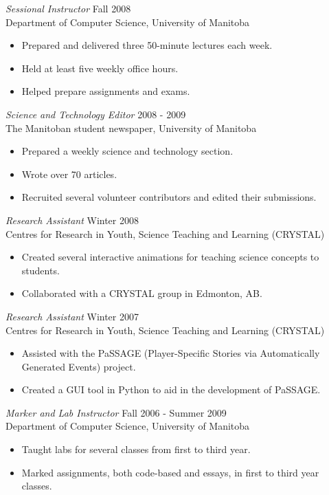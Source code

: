 \documentclass[line,margin]{res}
\begin{document}
\begin{resume}
  {\sl Sessional Instructor} \hfill Fall 2008 \\
  Department of Computer Science, University of Manitoba
  \begin{itemize}  \itemsep -2pt %
    \item Prepared and delivered three 50-minute lectures each week.
    \item Held at least five weekly office hours.
    \item Helped prepare assignments and exams.
  \end{itemize}

  {\sl Science and Technology Editor} \hfill 2008 - 2009 \\
  The Manitoban student newspaper, University of Manitoba
  \begin{itemize}  \itemsep -2pt %
    \item Prepared a weekly science and technology section.
    \item Wrote over 70 articles.
    \item Recruited several volunteer contributors and edited their submissions.
  \end{itemize}
  
  {\sl Research Assistant} \hfill Winter 2008 \\
  Centres for Research in Youth, Science Teaching and Learning (CRYSTAL)
  \begin{itemize}  \itemsep -2pt %
    \item Created several interactive animations for teaching science concepts to students.
    \item Collaborated with a CRYSTAL group in Edmonton, AB.
  \end{itemize}
  
  {\sl Research Assistant} \hfill Winter 2007 \\
  Centres for Research in Youth, Science Teaching and Learning (CRYSTAL)
  \begin{itemize}  \itemsep -2pt %
    \item Assisted with the PaSSAGE (Player-Specific Stories via Automatically Generated Events) project.
    \item Created a GUI tool in Python to aid in the development of PaSSAGE.
  \end{itemize}
  
  {\sl Marker and Lab Instructor} \hfill Fall 2006 - Summer 2009 \\
  Department of Computer Science, University of Manitoba
  \begin{itemize}  \itemsep -2pt %
    \item Taught labs for several classes from first to third year.
    \item Marked assignments, both code-based and essays, in first to third year classes.
  \end{itemize}


\end{resume}
\end{document}

